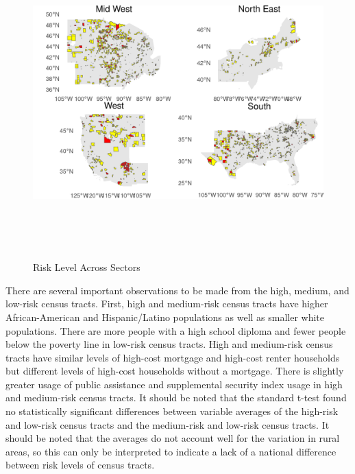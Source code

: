  \begin{figure}[htbp]
    \centering
     \includegraphics[width=\textwidth, height=12cm]{plots/regional_risk_map.png}
     \caption{Risk Level Across Sectors}
     \label{fig:regional_risk_map}
 \end{figure}

There are several important observations to be made from the high, medium, and low-risk census tracts. First, high and medium-risk census tracts have higher African-American and Hispanic/Latino populations as well as smaller white populations.  There are more people with a high school diploma and fewer people below the poverty line in low-risk census tracts. High and medium-risk census tracts have similar levels of high-cost mortgage and high-cost renter households but different levels of high-cost households without a mortgage. There is slightly greater usage of public assistance and supplemental security index usage in high and medium-risk census tracts. It should be noted that the standard t-test found no statistically significant differences between variable averages of the high-risk and low-risk census tracts and the medium-risk and low-risk census tracts. It should be noted that the averages do not account well for the variation in rural areas, so this can only be interpreted to indicate a lack of a national difference between risk levels of census tracts. 

\endinput